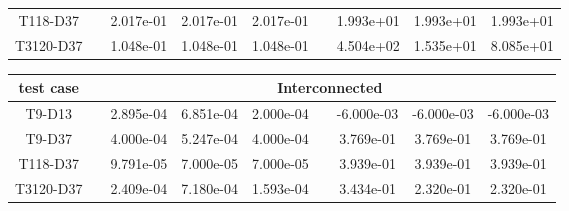 \begin{table}
\begin{adjustbox}{width=1\textwidth}
\begin{tabular}{ccccccccc}
T118-D37     &&  2.017e-01 &  2.017e-01 &  2.017e-01 &&  1.993e+01 &  1.993e+01 &  1.993e+01 \\
T3120-D37    &&  1.048e-01 &  1.048e-01 &  1.048e-01 &&  4.504e+02 &  1.535e+01 &  8.085e+01 \\
\bottomrule
\end{tabular}
\end{adjustbox}
\begin{adjustbox}{width=1\textwidth} %
\small
\begin{tabular}{ccccccccc}
\toprule
{test case} && \multicolumn{7}{c}{Interconnected}   \\
\midrule
T9-D13    &&  2.895e-04 &  6.851e-04 &  2.000e-04 &&  -6.000e-03 &  -6.000e-03 &  -6.000e-03 \\
T9-D37    &&  4.000e-04 &  5.247e-04 &  4.000e-04 &&   3.769e-01 &   3.769e-01 &   3.769e-01 \\
T118-D37  &&  9.791e-05 &  7.000e-05 &  7.000e-05 &&   3.939e-01 &   3.939e-01 &   3.939e-01 \\
T3120-D37 &&  2.409e-04 &  7.180e-04 &  1.593e-04 &&   3.434e-01 &   2.320e-01 &   2.320e-01 \\
\bottomrule
\end{tabular}
\end{adjustbox}


\end{table}
